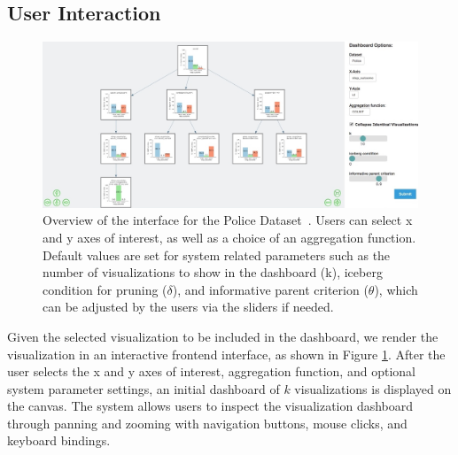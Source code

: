 \subsection{User Interaction\label{sec:interaction}}
\begin{figure}[ht!]
\centering
\includegraphics[width=\linewidth]{figures/overview.jpeg}
\caption{Overview of the \system interface for the Police Dataset~\cite{ctrp3}. Users can select x and y axes of interest, as well as a choice of an aggregation function. Default values are set for system related parameters such as the number of visualizations to show in the dashboard (k), iceberg condition for pruning ($\delta$), and informative parent criterion ($\theta$), which can be adjusted by the users via the sliders if needed.}
\label{fig:overview}
\end{figure}
\par Given the selected visualization to be included in the dashboard, we render the visualization in an interactive frontend interface, as shown in Figure \ref{fig:overview}. After the user selects the x and y axes of interest, aggregation function, and optional system parameter settings, an initial dashboard of $k$ visualizations is displayed on the canvas.  The system allows users to inspect the visualization dashboard through panning and zooming with navigation buttons, mouse clicks, and keyboard bindings. 

